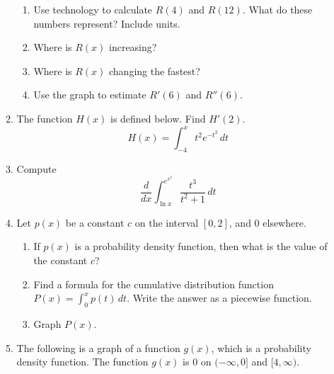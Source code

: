 \documentclass{article}
\begin{document}
\begin{itemize}
\begin{enumerate}
\begin{enumerate}
\item Use technology to calculate $R(4)$ and $R(12)$. What do these numbers represent? Include units.
\item Where is $R(x)$ increasing?
\item Where is $R(x)$ changing the fastest?
\item Use the graph to estimate $R'(6)$ and $R''(6)$.
\end{enumerate}
                    \item The function $H(x)$ is defined below. Find $H'(2)$.
                    $$H(x) = \int_{-4}^{x} t^2e^{-t^2}\,dt$$
                    \item Compute
                    $$\frac{d}{dx} \int_{\ln{x}}^{e^{x^2}} \frac{t^3}{t^2+1}\,dt$$
                    \item Let $p(x)$ be a constant $c$ on the interval $[0,2]$, and $0$ elsewhere.
                    \begin{enumerate}
                        \item If $p(x)$ is a probability density function, then what is the value of the constant $c$?
                        \item Find a formula for the cumulative distribution function $\displaystyle P(x)=\int_0^x p(t)\,dt$. Write the answer as a piecewise function. 
                        \item Graph $P(x)$.
                        
                    \end{enumerate}
                \item The following is a graph of a function $g(x)$, which is a probability density function. The function $g(x)$ is $0$ on $(-\infty,0]$ and $[4,\infty)$.
                        \begin{center}
\end{center}
\end{enumerate}
\end{itemize}
\end{document}
